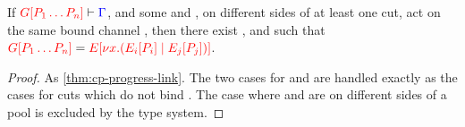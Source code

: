 \begin{lemmaB}\label{thm:nc-progress-beta}
  If $\seq[{ \cpPlug{G}{P_1 \dots P_n} }]{ \Gamma }$, and some  and
  , on different sides of at least one cut, act on the same bound
  channel , then there exist ,  and  such that 
  \(
  \tm{\cpPlug{G}{P_1 \dots P_n}} =
  \tm{\cpPlug{E}{\cpCut{x}{\cpPlug{E_i}{P_i}}{\cpPlug{E_j}{P_j}}}}
  \).
\end{lemmaB}
\begin{proof}
  As \cref{thm:cp-progress-link}.
  The two cases for
  and
  are handled exactly as the cases for cuts which do not bind .
  The case where  and  are on different sides of a pool is
  excluded by the type system.
\end{proof}
